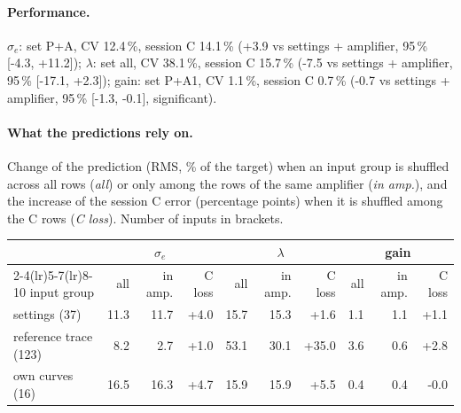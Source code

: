\paragraph{Performance.}
$\sigma_e$: set P+A, CV 12.4\,\%, session C 14.1\,\% (+3.9 vs settings + amplifier, 95\,\% [-4.3, +11.2]); $\lambda$: set all, CV 38.1\,\%, session C 15.7\,\% (-7.5 vs settings + amplifier, 95\,\% [-17.1, +2.3]); gain: set P+A1, CV 1.1\,\%, session C 0.7\,\% (-0.7 vs settings + amplifier, 95\,\% [-1.3, -0.1], significant).
\paragraph{What the predictions rely on.} Change of the prediction (RMS, \% of the target) when an input group is shuffled across all rows (\emph{all}) or only among the rows of the same amplifier (\emph{in amp.}), and the increase of the session C error (percentage points) when it is shuffled among the C rows (\emph{C loss}). Number of inputs in brackets.
\begin{center}\footnotesize
\begin{tabular}{lrrrrrrrrr}
\toprule
 & \multicolumn{3}{c}{$\sigma_e$} & \multicolumn{3}{c}{$\lambda$} & \multicolumn{3}{c}{gain} \\
\cmidrule(lr){2-4}\cmidrule(lr){5-7}\cmidrule(lr){8-10}
input group & all & in amp. & C loss & all & in amp. & C loss & all & in amp. & C loss \\
\midrule
settings (37) & 11.3 & 11.7 & +4.0 & 15.7 & 15.3 & +1.6 & 1.1 & 1.1 & +1.1 \\
reference trace (123) & 8.2 & 2.7 & +1.0 & 53.1 & 30.1 & +35.0 & 3.6 & 0.6 & +2.8 \\
own curves (16) & 16.5 & 16.3 & +4.7 & 15.9 & 15.9 & +5.5 & 0.4 & 0.4 & -0.0 \\
\bottomrule
\end{tabular}
\end{center}
